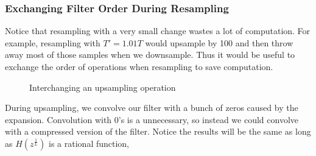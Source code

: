 \subsubsection{Exchanging Filter Order During Resampling}
Notice that resampling with a very small change wastes a lot of computation. For example, resampling with $T'=1.01T$ would upsample by 100 and then throw away most of those samples when we downsample. 
Thus it would be useful to exchange the order of operations when resampling to save computation.
\begin{gitbook-image}
\begin{figure}[!h]
  \centering
  \caption{Interchanging an upsampling operation}
  \label{fig:swap-upsample}
\end{figure}
\end{gitbook-image}
During upsampling, we convolve our filter with a bunch of zeros caused by the expansion. Convolution with 0's is a unnecessary, so instead we could convolve with a compressed version of the filter. Notice the results will be the same as long as $H(z^{\frac{1}{L}})$ is a rational function,

